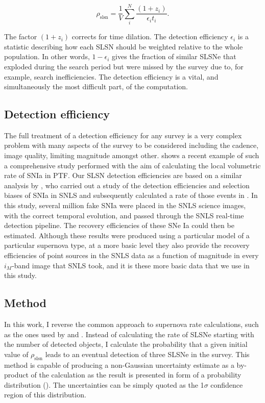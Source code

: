 \begin{equation}
\label{eq:rate}
\rho_{\mathrm{slsn}} = \frac{1}{V}\sum^{N}_{i}\frac{(1+z_i)}{\epsilon_{i}t_{i}}.
\end{equation}

The factor $(1+z_i)$ corrects for time dilation. The detection efficiency $\epsilon_i$ is a statistic describing how each SLSN should be weighted relative to the whole population. In other words, $1-\epsilon_i$ gives the fraction of similar SLSNe that exploded during the search period but were missed by the survey due to, for example, search inefficiencies. The detection efficiency is a vital, and simultaneously the most difficult part, of the computation.

\subsection{Detection efficiency}
The full treatment of a detection efficiency for any survey is a very complex problem with many aspects of the survey to be considered including the cadence, image quality, limiting magnitude amongst other. \citet{Frohmaier2017} shows a recent example of such a comprehensive study performed with the aim of calculating the local volumetric rate of SNIa in PTF. Our SLSN detection efficiencies are based on a similar analysis by \citet{Perrett2010}, who carried out a study of the detection efficiencies and selection biases of SNIa in SNLS and subsequently calculated a rate of those events in \cite{Perrett2012}. In this study, several million fake SNIa were placed in the SNLS science images, with the correct temporal evolution, and passed through the SNLS real-time detection pipeline. The recovery efficiencies of these SNe Ia could then be estimated. Although these results were produced using a particular model of a particular supernova type, at a more basic level they also provide the recovery efficiencies of point sources in the SNLS data as a function of magnitude in every $i_M$-band image that SNLS took, and it is these more basic data that we use in this study.

\subsection{Method}
In this work, I reverse the common approach to supernova rate calculations, such as the ones used by \citet{Perrett2012} and \citep{Frohmaier2017}. Instead of calculating the rate of SLSNe starting with the number of detected objects, I calculate the probability that a given initial value of $\rho_{\mathrm{slsn}}$ leads to an eventual detection of three SLSNe in the survey. This method is capable of producing a non-Gaussian uncertainty estimate as a by-product of the calculation as the result is presented in form of a probability distribution (). The uncertainties can be simply quoted as the 1$\sigma$ confidence region of this distribution.

